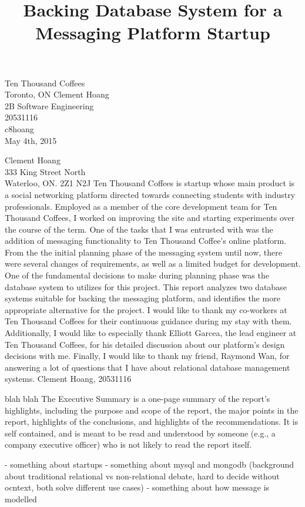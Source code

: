 \documentclass[12pt]{article}
\begin{document}
\title{Backing Database System for a Messaging Platform Startup}
{
	Ten Thousand Coffees\\
	Toronto, ON
}
{
	Clement Hoang\\
	2B Software Engineering\\
	20531116\\
	c8hoang\\
	May 4th, 2015
}


{
	\noindent
	Clement Hoang\\
	333 King Street North\\
	Waterloo, ON. 2Z1 N2J
}
{
	Ten Thousand Coffees is startup whose main product is a social networking platform directed towards connecting students with industry professionals. Employed as a member of the core development team for Ten Thousand Coffees, I worked on improving the site and starting experiments over the course of the term. One of the tasks that I was entrusted with was the addition of messaging functionality to Ten Thousand Coffee's online platform.
}
{
	From the the initial planning phase of the messaging system until now, there were several changes of requirements, as well as a limited budget for development. One of the fundamental decisions to make during planning phase was the database system to utilizes for this project. This report analyzes two database systems suitable for backing the messaging platform, and identifies the more appropriate alternative for the project.
}
{
	I would like to thank my co-workers at Ten Thousand Coffees for their continuous guidance during my stay with them. Additionally, I would like to especially thank Elliott Garcea, the lead engineer at Ten Thousand Coffees, for his detailed discussion about our platform's design decisions with me. Finally, I would like to thank my friend, Raymond Wan, for answering a lot of questions that I have about relational database management systems.
}
{
	Clement Hoang, 20531116
}


blah blah
The Executive Summary is a one-page summary of the report's highlights, including the purpose and scope of the report, the major points in the report, highlights of the conclusions, and highlights of the recommendations. It is self contained, and is meant to be read and understood by someone (e.g., a company executive officer) who is not likely to read the report itself.

- something about startups
- something about mysql and mongodb (background about traditional relational vs non-relational debate, hard to decide without ocntext, both solve different use cases)
- something about how message is modelled
\end{document}
